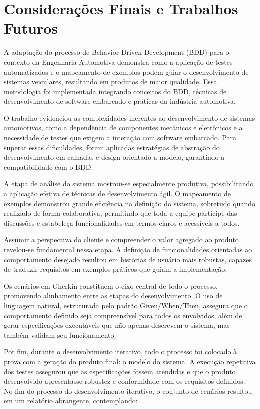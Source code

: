 \chapter{Considerações Finais e Trabalhos Futuros}
 
A adaptação do processo de Behavior-Driven Development (BDD) para o contexto da Engenharia Automotiva demonstra como a aplicação de testes automatizados e o 
mapeamento de exemplos podem guiar o desenvolvimento de sistemas veiculares, resultando em produtos de maior qualidade. Essa metodologia foi implementada integrando 
conceitos do BDD, técnicas de desenvolvimento de software embarcado e práticas da indústria automotiva.

O trabalho evidenciou as complexidades inerentes ao desenvolvimento de sistemas automotivos, como a dependência de componentes mecânicos e eletrônicos e a necessidade 
de testes que exigem a interação com software embarcado. Para superar essas dificuldades, foram aplicadas estratégias de abstração do desenvolvimento em camadas 
e design orientado a modelo, garantindo a compatibilidade com o BDD.

A etapa de análise do sistema mostrou-se especialmente produtiva, possibilitando a aplicação efetiva de técnicas de desenvolvimento ágil. O mapeamento de exemplos 
demonstrou grande eficiência na definição do sistema, sobretudo quando realizado de forma colaborativa, permitindo que toda a equipe participe das discussões e 
estabeleça funcionalidades em termos claros e acessíveis a todos.

Assumir a perspectiva do cliente e compreender o valor agregado ao produto revelou-se fundamental nessa etapa. A definição de funcionalidades orientadas ao 
comportamento desejado resultou em histórias de usuário mais robustas, capazes de traduzir requisitos em exemplos práticos que guiam a implementação.

Os cenários em Gherkin constituem o eixo central de todo o processo, promovendo alinhamento entre as etapas do desenvolvimento. O uso de linguagem natural, estruturada 
pelo padrão Given/When/Then, assegura que o comportamento definido seja compreensível para todos os envolvidos, além de gerar especificações executáveis que não 
apenas descrevem o sistema, mas também validam seu funcionamento.

Por fim, durante o desenvolvimento iterativo, todo o processo foi colocado à prova com a geração do produto final: o modelo do sistema. A execução repetitiva dos 
testes assegurou que as especificações fossem atendidas e que o produto desenvolvido apresentasse robustez e conformidade com os requisitos definidos. No fim do 
processo do desenvolvimento iterativo, o conjunto de cenários resultou em um relatório abrangente, contemplando:

